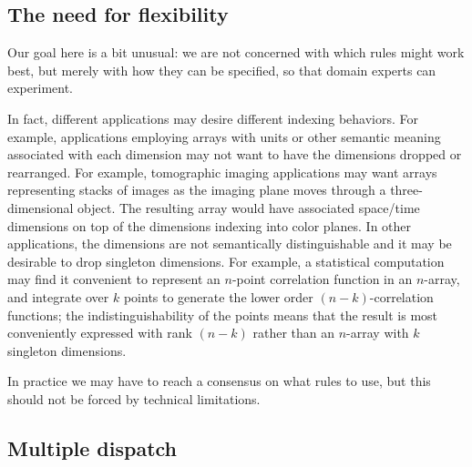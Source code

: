 \documentclass[preprint]{sigplanconf}
\begin{document}

\subsection{The need for flexibility}

Our goal here is a bit unusual: we are not concerned with which rules might
work best, but merely with how they can be specified, so that domain experts
can experiment.

In fact, different applications may desire different indexing behaviors. For
example, applications employing arrays with units or other semantic meaning
associated with each dimension may not want to have the dimensions dropped or
rearranged. For example, tomographic imaging applications may want arrays
representing stacks of images as the imaging plane moves through a three-
dimensional object. The resulting array would have associated space/time
dimensions on top of the dimensions indexing into color planes. In
other applications, the dimensions are not semantically distinguishable and it
may be desirable to drop singleton dimensions. For example, a statistical
computation may find it convenient to represent an $n$-point correlation
function in an $n$-array, and integrate over $k$ points to generate the lower
order $(n-k)$-correlation functions; the indistinguishability of the points
means that the result is most conveniently expressed with rank $(n-k)$
rather than an $n$-array with $k$ singleton dimensions.


In practice we may have to reach a consensus on what rules to use, but this
should not be forced by technical limitations.


\subsection{Multiple dispatch}
\end{document}
